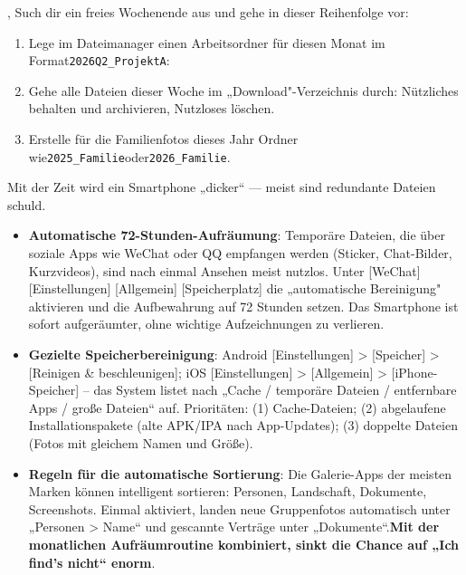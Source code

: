 \begin{tcbpractice}{,}
Such dir ein freies Wochenende aus und gehe in dieser Reihenfolge vor:

\begin{enumerate}
  \item Lege im Dateimanager einen Arbeitsordner für diesen Monat im Format\texttt{2026Q2\_ProjektA}:
  \item Gehe alle Dateien dieser Woche im „Download"-Verzeichnis durch: Nützliches behalten und archivieren, Nutzloses löschen.
  \item Erstelle für die Familienfotos dieses Jahr Ordner wie\texttt{2025\_Familie}oder\texttt{2026\_Familie}.
\end{enumerate}

\end{tcbpractice}


Mit der Zeit wird ein Smartphone „dicker“ — meist sind redundante Dateien schuld.

\begin{itemize}
  \item \textbf{Automatische 72-Stunden-Aufräumung}: Temporäre Dateien, die über soziale Apps wie WeChat oder QQ empfangen werden (Sticker, Chat-Bilder, Kurzvideos), sind nach einmal Ansehen meist nutzlos. Unter [WeChat] [Einstellungen] [Allgemein] [Speicherplatz] die „automatische Bereinigung" aktivieren und die Aufbewahrung auf 72 Stunden setzen. Das Smartphone ist sofort aufgeräumter, ohne wichtige Aufzeichnungen zu verlieren.
  \item \textbf{Gezielte Speicherbereinigung}: Android [Einstellungen] > [Speicher] > [Reinigen \& beschleunigen]; iOS [Einstellungen] > [Allgemein] > [iPhone-Speicher] – das System listet nach „Cache / temporäre Dateien / entfernbare Apps / große Dateien“ auf. Prioritäten: (1) Cache-Dateien; (2) abgelaufene Installationspakete (alte APK/IPA nach App-Updates); (3) doppelte Dateien (Fotos mit gleichem Namen und Größe).
  \item \textbf{Regeln für die automatische Sortierung}: Die Galerie-Apps der meisten Marken können intelligent sortieren: Personen, Landschaft, Dokumente, Screenshots. Einmal aktiviert, landen neue Gruppenfotos automatisch unter „Personen > Name“ und gescannte Verträge unter „Dokumente“.\textbf{Mit der monatlichen Aufräumroutine kombiniert, sinkt die Chance auf „Ich find’s nicht“ enorm}.
\end{itemize}

